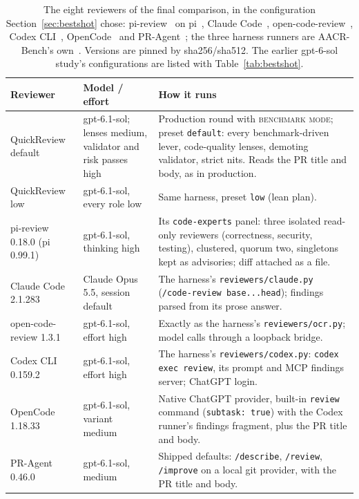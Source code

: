 \documentclass[11pt,a4paper]{article}
\newcommand{\qcr}{QuickReview}
\newcommand{\code}[1]{\texttt{#1}}
\begin{document}
\begin{table}[tbp]
  \centering
  \small
  \caption{The eight reviewers of the final comparison, in the
  configuration Section~\ref{sec:bestshot} chose: pi-review~\cite{pireview}
  on pi~\cite{pi}, Claude Code~\cite{claudecode},
  open-code-review~\cite{ocr}, Codex CLI~\cite{codex},
  OpenCode~\cite{opencode} and PR-Agent~\cite{pragent}; the three harness
  runners are AACR-Bench's own~\cite{aacrrepo}. Versions are pinned by
  sha256/sha512. The earlier gpt-6-sol study's configurations are listed
  with Table~\ref{tab:bestshot}.}
  \label{tab:reviewers}
  \begin{tabularx}{\textwidth}{>{\raggedright\arraybackslash}p{2.7cm} >{\raggedright\arraybackslash}p{2.9cm} X}
    \toprule
    Reviewer & Model / effort & How it runs \\
    \midrule
    \qcr{} default & gpt-6.1-sol; lenses medium, validator and risk passes high &
      Production round with \textsc{benchmark mode}; preset \code{default}:
      every benchmark-driven lever, code-quality lenses, demoting
      validator, strict nits. Reads the PR title and body, as in production. \\
    \qcr{} low & gpt-6.1-sol, every role low & Same harness, preset \code{low} (lean plan). \\
    pi-review 0.18.0 (pi 0.99.1) & gpt-6.1-sol, thinking high & Its
      \code{code-experts} panel: three isolated read-only reviewers
      (correctness, security, testing), clustered, quorum two, singletons
      kept as advisories; diff attached as a file. \\
    Claude Code 2.1.283 & Claude Opus 5.5, session default & The
      harness's \code{reviewers/claude.py} (\code{/code-review base...head});
      findings parsed from its prose answer. \\
    open-code-review 1.3.1 & gpt-6.1-sol, effort high & Exactly as the
      harness's \code{reviewers/ocr.py}; model calls through a loopback bridge. \\
    Codex CLI 0.159.2 & gpt-6.1-sol, effort high & The harness's
      \code{reviewers/codex.py}: \code{codex exec review}, its prompt and
      MCP findings server; ChatGPT login. \\
    OpenCode 1.18.33 & gpt-6.1-sol, variant medium & Native ChatGPT
      provider, built-in \code{review} command (\code{subtask: true}) with the
      Codex runner's findings fragment, plus the PR title and body. \\
    PR-Agent 0.46.0 & gpt-6.1-sol, medium & Shipped defaults:
      \code{/describe}, \code{/review}, \code{/improve} on a local git
      provider, with the PR title and body. \\
    \bottomrule
  \end{tabularx}
\end{table}
\end{document}
